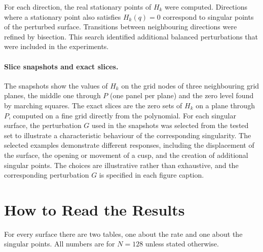 \documentclass[12pt, a4paper]{article}
\theoremstyle{plain}
\theoremstyle{definition}
\theoremstyle{remark}
\theoremstyle{definition}
\begin{document}
For each direction, the real stationary points of $H_k$ were computed. 
Directions where a stationary point also satisfies $H_k(q)=0$ correspond to singular points of the perturbed surface.
Transitions between neighbouring directions were refined by bisection. 
This search identified additional balanced perturbations that were included in the experiments.


\paragraph{Slice snapshots and exact slices.} The snapshots show the values of
$H_k$ on the grid nodes of three neighbouring grid planes, the middle one through $P$ (one panel per plane) and the zero level found by marching squares.
The exact slices are the zero sets of $H_k$ on a plane through $P$, computed on a fine grid directly from the polynomial.
For each singular surface, the perturbation \(G\) used in the snapshots was selected from the tested set to illustrate a characteristic behaviour of the corresponding singularity. 
The selected examples demonstrate different responses, including the displacement of the surface, the opening or movement of a cusp, and the creation of additional singular points. 
The choices are illustrative rather than exhaustive, and the corresponding perturbation \(G\) is specified in each figure caption.



\section{How to Read the Results}
\label{sec:r-read}

For every surface there are two tables, one about the rate and one about the
singular points. All numbers are for $N=128$ unless stated otherwise.
\end{document}
